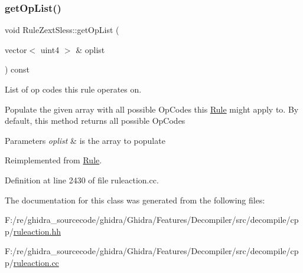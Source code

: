 \subsubsection{\texorpdfstring{getOpList()}{getOpList()}}
{\footnotesize\ttfamily void Rule\+Zext\+Sless\+::get\+Op\+List (\begin{DoxyParamCaption}\item[{vector$<$ uint4 $>$ \&}]{oplist }\end{DoxyParamCaption}) const\hspace{0.3cm}{\ttfamily [virtual]}}



List of op codes this rule operates on. 

Populate the given array with all possible Op\+Codes this \mbox{\hyperlink{class_rule}{Rule}} might apply to. By default, this method returns all possible Op\+Codes 
\begin{DoxyParams}{Parameters}
{\em oplist} & is the array to populate \\
\hline
\end{DoxyParams}


Reimplemented from \mbox{\hyperlink{class_rule_a4023bfc7825de0ab866790551856d10e}{Rule}}.



Definition at line 2430 of file ruleaction.\+cc.



The documentation for this class was generated from the following files\+:\begin{DoxyCompactItemize}
\item 
F\+:/re/ghidra\+\_\+sourcecode/ghidra/\+Ghidra/\+Features/\+Decompiler/src/decompile/cpp/\mbox{\hyperlink{ruleaction_8hh}{ruleaction.\+hh}}\item 
F\+:/re/ghidra\+\_\+sourcecode/ghidra/\+Ghidra/\+Features/\+Decompiler/src/decompile/cpp/\mbox{\hyperlink{ruleaction_8cc}{ruleaction.\+cc}}\end{DoxyCompactItemize}

